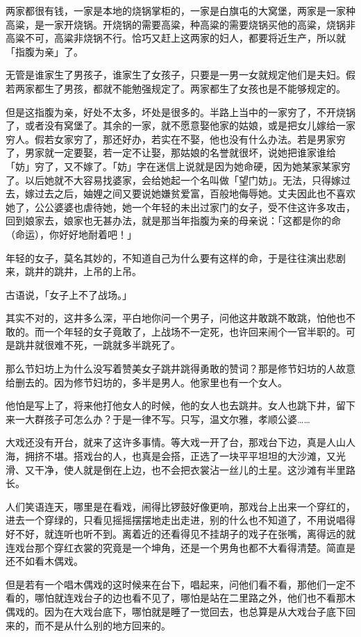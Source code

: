 \documentclass[UTF8]{ctexart}
\begin{document}
两家都很有钱，一家是本地的烧锅掌柜的，一家是白旗屯的大窝堡，两家是一家种高粱，是一家开烧锅。开烧锅的需要高粱，种高粱的需要烧锅买他的高粱，烧锅非高粱不可，高粱非烧锅不行。恰巧又赶上这两家的妇人，都要将近生产，所以就「指腹为亲」了。

无管是谁家生了男孩子，谁家生了女孩子，只要是一男一女就规定他们是夫妇。假若两家都生了男孩，都就不能勉强规定了。两家都生了女孩也是不能够规定的。

但是这指腹为亲，好处不太多，坏处是很多的。半路上当中的一家穷了，不开烧锅了，或者没有窝堡了。其余的一家，就不愿意娶他家的姑娘，或是把女儿嫁给一家穷人。假若女家穷了，那还好办，若实在不娶，他也没有什么办法。若是男家穷了，男家就一定要娶，若一定不让娶，那姑娘的名誉就很坏，说她把谁家谁给「妨」穷了，又不嫁了。「妨」字在迷信上说就是因为她命硬，因为她某家某家穷了。以后她就不大容易找婆家，会给她起一个名叫做「望门妨」。无法，只得嫁过去，嫁过去之后，妯娌之间又要说她嫌贫爱富，百般地侮辱她。丈夫因此也不喜欢她了，公公婆婆也虐待她，她一个年轻的未出过家门的女子，受不住这许多攻击，回到娘家去，娘家也无甚办法，就是那当年指腹为亲的母亲说：{「这都是你的命（命运），你好好地耐着吧！」}

年轻的女子，莫名其妙的，不知道自己为什么要有这样的命，于是往往演出悲剧来，跳井的跳井，上吊的上吊。

古语说，「女子上不了战场。」

其实不对的，这井多么深，平白地你问一个男子，问他这井敢跳不敢跳，怕他也不敢的。而一个年轻的女子竟敢了，上战场不一定死，也许回来闹个一官半职的。可是跳井就很难不死，一跳就多半跳死了。

那么节妇坊上为什么没写着赞美女子跳井跳得勇敢的赞词？那是修节妇坊的人故意给删去的。因为修节妇坊的，多半是男人。他家里也有一个女人。

他怕是写上了，将来他打他女人的时候，他的女人也去跳井。女人也跳下井，留下来一大群孩子可怎么办？于是一律不写。只写，温文尔雅，孝顺公婆……

大戏还没有开台，就来了这许多事情。等大戏一开了台，那戏台下边，真是人山人海，拥挤不堪。搭戏台的人，也真是会搭，正选了一块平平坦坦的大沙滩，又光滑、又干净，使人就是倒在上边，也不会把衣裳沾一丝儿的土星。这沙滩有半里路长。

人们笑语连天，哪里是在看戏，闹得比锣鼓好像更响，那戏台上出来一个穿红的，进去一个穿绿的，只看见摇摇摆摆地走出走进，别的什么也不知道了，不用说唱得好不好，就连听也听不到。离着近的还看得见不挂胡子的戏子在张嘴，离得远的就连戏台那个穿红衣裳的究竟是一个坤角，还是一个男角也都不大看得清楚。简直是还不如看木偶戏。

但是若有一个唱木偶戏的这时候来在台下，唱起来，问他们看不看，那他们一定不看的，哪怕就连戏台子的边也看不见了，哪怕是站在二里路之外，他们也不看那木偶戏的。因为在大戏台底下，哪怕就是睡了一觉回去，也总算是从大戏台子底下回来的，而不是从什么别的地方回来的。
\end{document}
